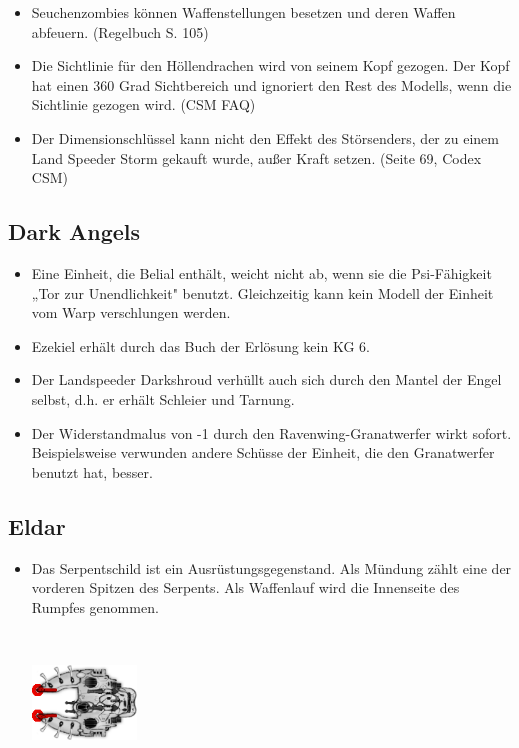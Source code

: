 \begin{itemize}
 \item Seuchenzombies können Waffenstellungen besetzen und deren Waffen
  abfeuern.  (Regelbuch S. 105)

 \item Die Sichtlinie für den Höllendrachen wird von seinem Kopf gezogen. Der
  Kopf hat einen 360 Grad Sichtbereich und ignoriert den Rest des Modells, wenn
  die Sichtlinie gezogen wird. (CSM FAQ)

 \item Der Dimensionschlüssel kann nicht den Effekt des Störsenders, der zu
  einem Land Speeder Storm gekauft wurde, außer Kraft setzen. (Seite 69, Codex
  CSM) 

\end{itemize}

\subsection{Dark Angels}

\begin{itemize}

 \item Eine Einheit, die Belial enthält, weicht nicht ab, wenn sie die
  Psi-Fähigkeit „Tor zur Unendlichkeit" benutzt. Gleichzeitig kann kein Modell
  der Einheit vom Warp verschlungen werden.

 \item Ezekiel erhält durch das Buch der Erlösung kein KG 6.

 \item Der Landspeeder Darkshroud verhüllt auch sich durch den Mantel der Engel
  selbst, d.h. er erhält Schleier und Tarnung.

 \item Der Widerstandmalus von -1 durch den Ravenwing-Granatwerfer wirkt sofort.
  Beispielsweise verwunden andere Schüsse der Einheit, die den Granatwerfer
  benutzt hat, besser.

\end{itemize}

\subsection{Eldar}

\begin{itemize}

 \item 
  \begin{minipage}[t]{0.65\textwidth}
Das Serpentschild ist ein Ausrüstungsgegenstand. Als Mündung zählt eine der
vorderen Spitzen des Serpents. Als Waffenlauf wird die Innenseite des Rumpfes
genommen. 
\end{minipage} \
  \begin{minipage}[t]{0.35\textwidth}
\includegraphics[height=2cm, valign=T, margin=0.0cm]{Bilder/serpent_transparent.png}
\end{minipage}

\end{itemize}

